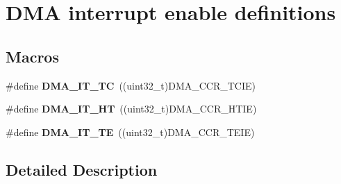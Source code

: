 \hypertarget{group___d_m_a__interrupt__enable__definitions}{}\section{D\+MA interrupt enable definitions}
\label{group___d_m_a__interrupt__enable__definitions}
\subsection*{Macros}
\begin{DoxyCompactItemize}
\item 
\mbox{\label{group___d_m_a__interrupt__enable__definitions_ga06e83dd277e0d3e5635cf8ce8dfd6e16}} 
\#define {\bfseries D\+M\+A\+\_\+\+I\+T\+\_\+\+TC}~((uint32\+\_\+t)D\+M\+A\+\_\+\+C\+C\+R\+\_\+\+T\+C\+IE)
\item 
\mbox{\label{group___d_m_a__interrupt__enable__definitions_gadf11c572b9797e04a14b105fdc2e5f66}} 
\#define {\bfseries D\+M\+A\+\_\+\+I\+T\+\_\+\+HT}~((uint32\+\_\+t)D\+M\+A\+\_\+\+C\+C\+R\+\_\+\+H\+T\+IE)
\item 
\mbox{\label{group___d_m_a__interrupt__enable__definitions_gaf9d92649d2a0146f663ff253d8f3b59e}} 
\#define {\bfseries D\+M\+A\+\_\+\+I\+T\+\_\+\+TE}~((uint32\+\_\+t)D\+M\+A\+\_\+\+C\+C\+R\+\_\+\+T\+E\+IE)
\end{DoxyCompactItemize}


\subsection{Detailed Description}
